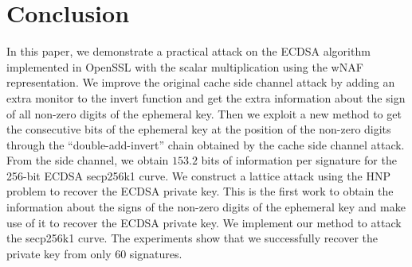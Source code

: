 \section{Conclusion}
\label{sec:conclusion}
In this paper, we demonstrate a practical attack on the ECDSA algorithm implemented in OpenSSL with the scalar multiplication using the wNAF representation.
We improve the original cache side channel attack
 by adding an extra monitor to the invert function and get the extra information about the sign of all non-zero digits of the ephemeral key.
Then we exploit a new method to get the consecutive bits of the ephemeral key at the position of the non-zero digits through the ``double-add-invert'' chain obtained by the cache side channel attack.
From the side channel, we obtain $153.2$ bits of information per signature for the 256-bit ECDSA secp256k1 curve.
We construct a lattice attack using the HNP problem to recover the ECDSA private key.
This is the first work to obtain the information about the signs of the non-zero digits of the ephemeral key and make use of it to recover the ECDSA private key.
We implement our method to attack the secp256k1 curve.
The experiments show that we successfully recover the private key from only $60$ signatures.


